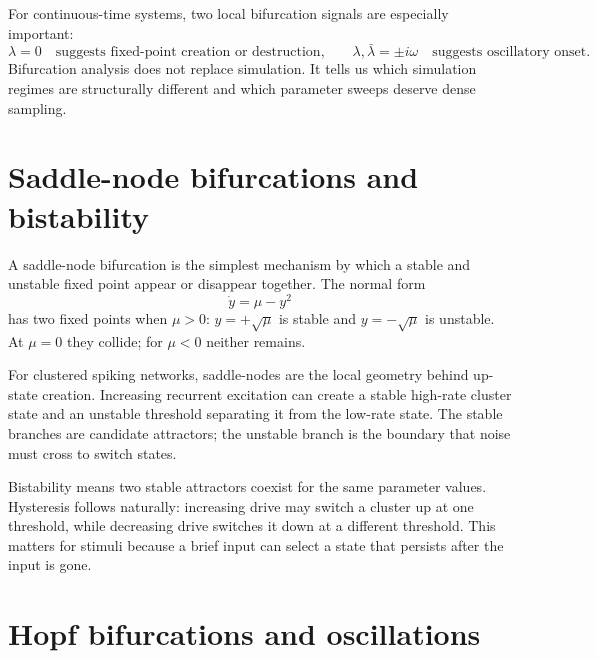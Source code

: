For continuous-time systems, two local bifurcation signals are especially important:
%
\begin{equation}
  \lambda=0
  \quad\text{suggests fixed-point creation or destruction,}
  \qquad
  \lambda,\bar{\lambda}=\pm i\omega
  \quad\text{suggests oscillatory onset.}
  \label{eq:bifurcation-eigenvalue-signals}
\end{equation}
%
Bifurcation analysis does not replace simulation. It tells us which simulation regimes are structurally different and which parameter sweeps deserve dense sampling.

\section{Saddle-node bifurcations and bistability}
\label{sec:saddle-node-bistability-clustered}

A saddle-node bifurcation is the simplest mechanism by which a stable and unstable fixed point appear or disappear together. The normal form
%
\begin{equation}
  \dot y = \mu - y^2
  \label{eq:saddle-node-normal-form}
\end{equation}
%
has two fixed points when $\mu>0$: $y=+\sqrt{\mu}$ is stable and $y=-\sqrt{\mu}$ is unstable. At $\mu=0$ they collide; for $\mu<0$ neither remains.

For clustered spiking networks, saddle-nodes are the local geometry behind up-state creation. Increasing recurrent excitation can create a stable high-rate cluster state and an unstable threshold separating it from the low-rate state. The stable branches are candidate attractors; the unstable branch is the boundary that noise must cross to switch states.

Bistability means two stable attractors coexist for the same parameter values. Hysteresis follows naturally: increasing drive may switch a cluster up at one threshold, while decreasing drive switches it down at a different threshold. This matters for stimuli because a brief input can select a state that persists after the input is gone.

\section{Hopf bifurcations and oscillations}
\label{sec:hopf-clustered}

